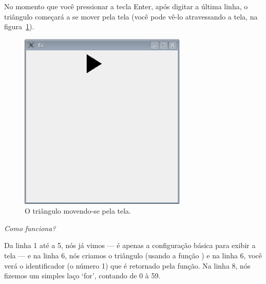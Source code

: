 No momento que você pressionar a tecla Enter, após digitar a última linha, o triângulo começará a se mover pela tela (você pode vê-lo atravessando a tela, na figura~\ref{fig44}).

\begin{figure}
\begin{center}
\includegraphics[width=80mm]{eps/figure44.eps}
\end{center}
\caption{O triângulo movendo-se pela tela.}\label{fig44}
\end{figure}

\par
\emph{Como funciona?}
\par
Da linha 1 até a 5, nós já vimos --- é apenas a configuração básica para exibir a tela --- e na linha 6, nós criamos o triângulo (usando a função ) e na linha 6, você verá o identificador (o número 1) que é retornado pela função. Na linha 8, nós fizemos um simples laço `for', contando de 0 à 59.

